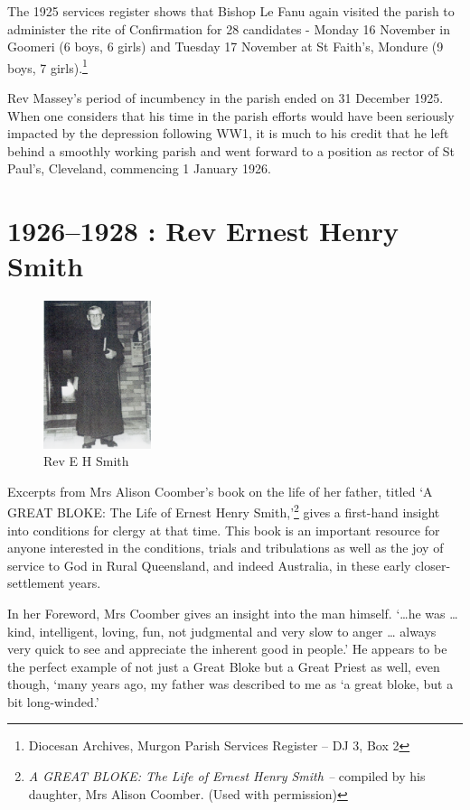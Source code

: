 The 1925 services register shows that Bishop Le Fanu again visited the
parish to administer the rite of Confirmation for 28 candidates - Monday
16 November in Goomeri (6 boys, 6 girls) and Tuesday 17 November at St
Faith's, Mondure (9 boys, 7 girls).\footnote{Diocesan Archives, Murgon
  Parish Services Register -- DJ 3, Box 2}

Rev Massey's period of incumbency in the parish ended on 31 December
1925. When one considers that his time in the parish efforts would have
been seriously impacted by the depression following WW1, it is much to
his credit that he left behind a smoothly working parish and went
forward to a position as rector of St Paul's, Cleveland, commencing 1
January 1926.

\printendnotes
\setcounter{endnote}{0}
\chapter{1926--1928 : Rev Ernest Henry
Smith}




\begin{figure}
\begin{center}
\includegraphics[width=0.28\textwidth,right]{images/EHSmith.png}
\caption{Rev E H Smith}
\end{center}
\end{figure}


Excerpts from Mrs Alison Coomber's book on the life of her father,
titled `A GREAT BLOKE: The Life of Ernest Henry Smith,'\footnote{\emph{A
  GREAT BLOKE: The Life of Ernest Henry Smith --} compiled by his
  daughter, Mrs Alison Coomber. (Used with permission)} gives a
first-hand insight into conditions for clergy at that time. This book is
an important resource for anyone interested in the conditions, trials
and tribulations as well as the joy of service to God in Rural
Queensland, and indeed Australia, in these early closer-settlement
years.

In her Foreword, Mrs Coomber gives an insight into the man himself.
`\ldots he was \ldots{} kind, intelligent, loving, fun, not judgmental
and very slow to anger \ldots{} always very quick to see and appreciate
the inherent good in people.' He appears to be the perfect example of
not just a Great Bloke but a Great Priest as well, even though, `many
years ago, my father was described to me as `a great bloke, but a bit
long-winded.'

